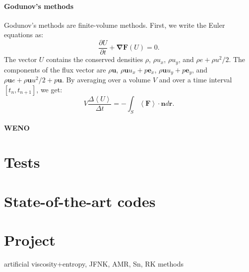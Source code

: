 \documentclass[letterpaper]{report}
\newcommand\bn{\boldsymbol{\nabla}}
\newcommand\br{\mathbf{r}}
\newcommand\la{\left\langle}
\newcommand\ra{\right\rangle}
\newcommand\bs{\boldsymbol}
\renewcommand{\(}{\left(}
\renewcommand{\)}{\right)}
\renewcommand{\[}{\left[}
\renewcommand{\]}{\right]}
\begin{document}
\subsubsection{Godunov's methods}
Godunov's methods are finite-volume methods. First, we write the Euler
equations as:
\begin{equation}
  \frac{\partial U}{\partial t} + \bn \bs{F}(U)=0.
\end{equation}
The vector $U$ contains the conserved densities $\rho$, $\rho u_x$, $\rho
u_y$, and $\rho e + \rho u^2/2$. The components of the flux vector are $\rho
\bs{u}$, $\rho \bs{u}u_x+ p\bs{e}_x$, $\rho \bs{u} u_y+p\bs{e}_y$, and $\rho
\bs{u} e +\rho \bs{u} u^2/2+p\bs{u}$. By averaging over a volume $V$ and over
a time interval $[t_n,t_{n+1}]$, we get:
\begin{equation}
  V\frac{\Delta \la U\ra}{\Delta t} = -\int_S\la \bs{F} \ra \cdot \bs{n} d\br.
\end{equation}

\subsubsection{WENO}

\chapter{Tests}

\chapter{State-of-the-art codes}

\chapter{Project}
artificial viscosity+entropy, JFNK, AMR, Sn, RK methods
\end{document}
